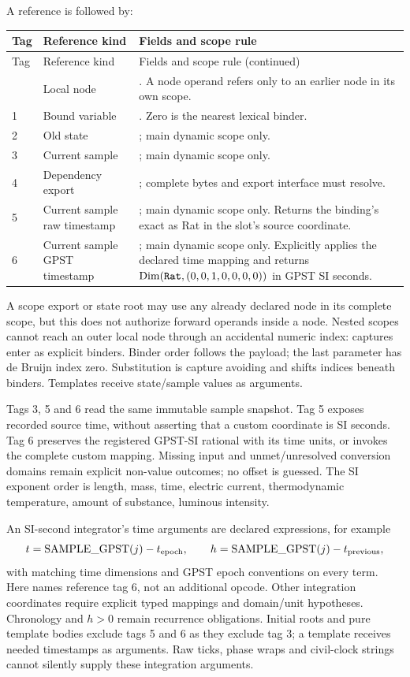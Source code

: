 A reference is  followed by:
\begin{longtable}{@{}P{.08\linewidth}P{.24\linewidth}P{.63\linewidth}@{}}
\toprule Tag & Reference kind & Fields and scope rule\\\midrule\endfirsthead
\toprule Tag & Reference kind & Fields and scope rule (continued)\\\midrule\endhead
\bottomrule{} & Local node & . A node operand refers only to an earlier node
in its own scope.\\
1 & Bound variable & . Zero is the nearest lexical binder.\\
2 & Old state & ; main dynamic scope only.\\
3 & Current sample & ; main dynamic scope only.\\
4 & Dependency export & ; complete bytes and export
interface must resolve.\\
5 & Current sample raw timestamp & ; main dynamic scope only.
Returns the binding's exact  as Rat in the slot's source
 coordinate.\\
6 & Current sample GPST timestamp & ; main dynamic scope only.
Explicitly applies the declared time mapping and returns
$\mathrm{Dim}(\xo{Rat},(0,0,1,0,0,0,0))$ in GPST SI seconds.\\
\end{longtable}
A scope export or state root may use any already declared node in its complete
scope, but this does not authorize forward operands inside a node. Nested
scopes cannot reach an outer local node through an accidental numeric index:
captures enter as explicit binders. Binder order follows the payload; the last
parameter has de Bruijn index zero. Substitution is capture avoiding and shifts
indices beneath binders. Templates receive state/sample values as arguments.

Tags 3, 5 and 6 read the same immutable sample snapshot. Tag 5 exposes recorded
source time, without asserting that a custom coordinate is SI seconds. Tag 6
preserves the registered GPST-SI rational with its time units, or invokes the
complete custom mapping. Missing input and unmet/unresolved conversion domains
remain explicit non-value outcomes; no offset is guessed. The SI exponent order
is length, mass, time, electric current, thermodynamic temperature, amount of
substance, luminous intensity.

An SI-second integrator's time arguments are declared expressions, for example
\[
 t=\operatorname{SAMPLE\_GPST}(j)-t_{\rm epoch},\qquad
 h=\operatorname{SAMPLE\_GPST}(j)-t_{\rm previous},
\]
with matching time dimensions and GPST epoch conventions on every term.
Here  names reference tag 6, not an additional opcode.
Other integration coordinates require explicit typed mappings and domain/unit
hypotheses. Chronology and $h>0$ remain recurrence obligations. Initial roots and
pure template bodies exclude tags 5 and 6 as they exclude tag 3; a template
receives needed timestamps as arguments. Raw ticks, phase wraps and civil-clock
strings cannot silently supply these integration arguments.

